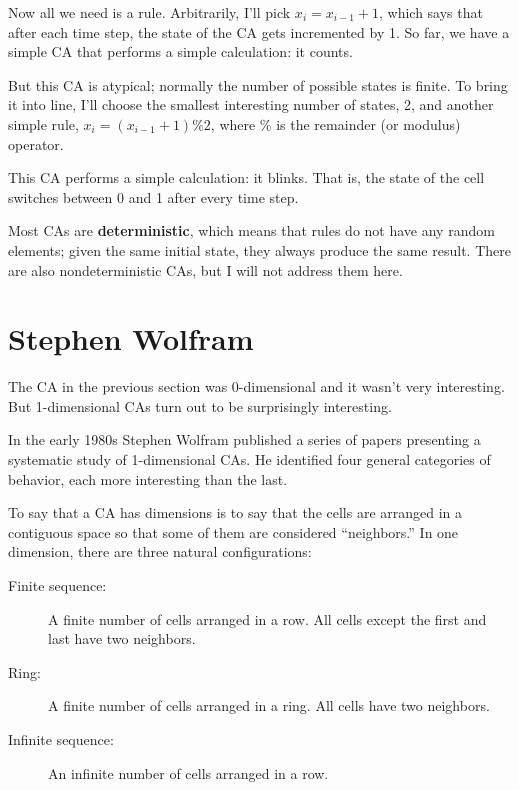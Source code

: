 \documentclass[10pt]{book}
\begin{document}
Now all we need is a rule.  Arbitrarily, I'll pick $x_i = x_{i-1} + 1$,
which says that after each time step, the state of the CA gets
incremented by 1.  So far, we have a simple CA that performs
a simple calculation: it counts.

But this CA is atypical; normally the number of
possible states is finite.  To bring it into line, I'll choose the
smallest interesting number of states, 2, and another simple rule,
$x_i = (x_{i-1} + 1) \% 2$, where $\%$ is the remainder (or
modulus) operator.

This CA performs a simple calculation: it blinks.  That is,
the state of the cell switches between 0 and 1 after every time step.

Most CAs are {\bf deterministic}, which means that rules do not
have any random elements; given the same initial state, they
always produce the same result.  There are also nondeterministic
CAs, but I will not address them here.



\section{Stephen Wolfram}

The CA in the previous section was 0-dimensional and it wasn't very
interesting.  But 1-dimensional CAs turn out to be surprisingly
interesting.

In the early 1980s Stephen Wolfram published a series of papers
presenting a systematic study of 1-dimensional CAs.  He identified
four general categories of behavior, each more interesting than
the last.

To say that a CA has dimensions is to say that the cells are
arranged in a contiguous space so that some of them are
considered ``neighbors.''  In one dimension, there are three
natural configurations:

\begin{description}

\item[Finite sequence:] A finite number of cells arranged
in a row.  All cells except the first and last have two neighbors.

\item[Ring:] A finite number of cells arranged
in a ring.  All cells have two neighbors.

\item[Infinite sequence:] An infinite number of cells arranged
in a row.

\end{description}
\end{document}
